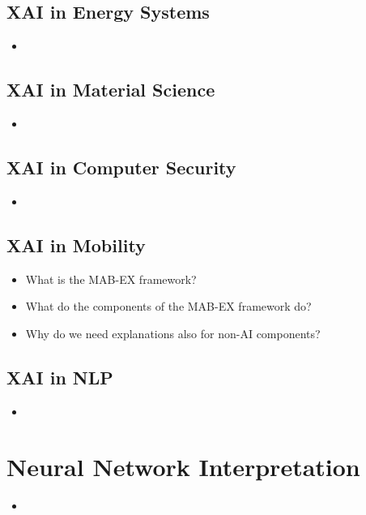 \documentclass{report}
\begin{document}
		\subsection{XAI in Energy Systems}
		
		\begin{itemize}
		\item 
		\end{itemize}
	
		\subsection{XAI in Material Science}
		
		\begin{itemize}
		\item 
		\end{itemize}
	
		\subsection{XAI in Computer Security}
		
		\begin{itemize}
		\item 
		\end{itemize}
	
		\subsection{XAI in Mobility}
		
		\begin{itemize}
		\item What is the MAB-EX framework?
		\item What do the components of the MAB-EX framework do?
		\item Why do we need explanations also for non-AI components?
		\end{itemize}
	
		\subsection{XAI in NLP}
		
		\begin{itemize}
		\item 
		\end{itemize}
	
	\section{Neural Network Interpretation}
	
	\begin{itemize}
		\item 
	\end{itemize}
	
	
\end{document}

